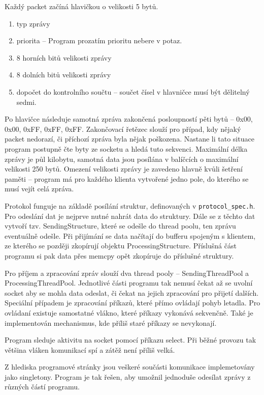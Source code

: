 \documentclass[a4paper,oneside,12pt]{report}
\begin{document}
Každý packet začíná hlavičkou o velikosti 5 bytů.

\begin{enumerate}
  \item typ zprávy
  \item priorita -- Program prozatím prioritu nebere v potaz.
  \item 8 horních bitů velikosti zprávy
  \item 8 dolních bitů velikosti zprávy
  \item dopočet do kontrolního součtu -- součet čísel v hlavničce musí být dělitelný sedmi.
\end{enumerate}

Po hlavičce následuje samotná zpráva zakončená posloupností pěti bytů -- 0x00, 0x00, 0xFF, 0xFF, 0xFF.
Zakončovací řetězec slouží pro případ, kdy nějaký packet nedorazí, či příchozí zpráva byla nějak poškozena.
Nastane li tato situace program postupně čte byty ze socketu a hledá tuto sekvenci.
Maximální délka zprávy je půl kilobytu, samotná data jsou posílána v balíčcích o maximální velikosti 250 bytů.
Omezení velikosti zprávy je zavedeno hlavně kvůli šetření paměti -- program má pro každého klienta vytvořené jedno pole, do kterého se musí vejít celá zpráva.

Protokol funguje na základě posílání struktur, definovaných v  \verb|protocol_spec.h|.
Pro odeslání dat je nejprve nutné nahrát data do struktury.
Dále se z těchto dat vytvoří tzv. SendingStructure, které se odešle do thread poolu, ten zprávu eventuálně odešle.
Při přijímání se data načítají do bufferu spojeným s klientem, ze kterého se později zkopírují objektu ProcessingStructure.
Příslušná část programu si pak data přes memcpy opět zkopíruje do příslušné struktury.

Pro příjem a zpracování zpráv slouží dva thread pooly -- SendingThreadPool a ProcessingThreadPool.
Jednotlivé části programu tak nemusí čekat až se uvolní socket aby se mohla data odeslat, či čekat na jejich zpracování pro přijetí dalších.
Speciální případem je zpracování příkazů, které přímo ovládají pohyb letadla.
Pro ovládaní existuje samostatné vlákno, které příkazy vykonává sekvenčně.
Také je implementován mechanismus, kde příliš staré příkazy se nevykonají.

Program sleduje aktivitu na socket pomocí příkazu select.
Při běžné provozu tak většina vláken komunikací spí a zátěž není příliš velká.

Z hlediska programové stránky jsou veškeré součásti komunikace implemetovány jako singletony.
Program je tak řešen, aby umožnil jednoduše odesílat zprávy z různých částí programu.
\end{document}
